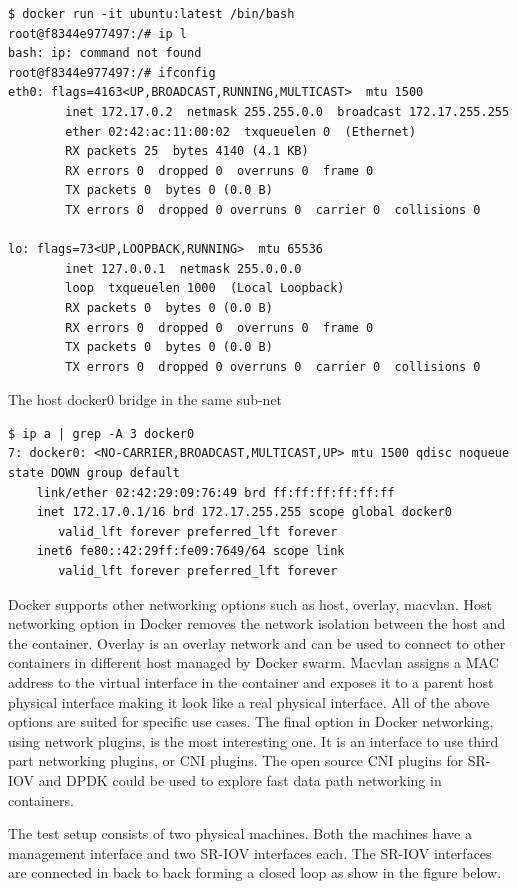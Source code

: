 \documentclass[english, 12pt, a4paper, elec, utf8, a-1b, online]{aaltothesis}
\begin{document}
\begin{lstlisting}[basicstyle={\small\ttfamily}]
$ docker run -it ubuntu:latest /bin/bash
root@f8344e977497:/# ip l
bash: ip: command not found
root@f8344e977497:/# ifconfig 
eth0: flags=4163<UP,BROADCAST,RUNNING,MULTICAST>  mtu 1500
        inet 172.17.0.2  netmask 255.255.0.0  broadcast 172.17.255.255
        ether 02:42:ac:11:00:02  txqueuelen 0  (Ethernet)
        RX packets 25  bytes 4140 (4.1 KB)
        RX errors 0  dropped 0  overruns 0  frame 0
        TX packets 0  bytes 0 (0.0 B)
        TX errors 0  dropped 0 overruns 0  carrier 0  collisions 0

lo: flags=73<UP,LOOPBACK,RUNNING>  mtu 65536
        inet 127.0.0.1  netmask 255.0.0.0
        loop  txqueuelen 1000  (Local Loopback)
        RX packets 0  bytes 0 (0.0 B)
        RX errors 0  dropped 0  overruns 0  frame 0
        TX packets 0  bytes 0 (0.0 B)
        TX errors 0  dropped 0 overruns 0  carrier 0  collisions 0
\end{lstlisting}
The host docker0 bridge in the same sub-net
\begin{lstlisting}[basicstyle={\small\ttfamily}]
$ ip a | grep -A 3 docker0
7: docker0: <NO-CARRIER,BROADCAST,MULTICAST,UP> mtu 1500 qdisc noqueue state DOWN group default 
    link/ether 02:42:29:09:76:49 brd ff:ff:ff:ff:ff:ff
    inet 172.17.0.1/16 brd 172.17.255.255 scope global docker0
       valid_lft forever preferred_lft forever
    inet6 fe80::42:29ff:fe09:7649/64 scope link 
       valid_lft forever preferred_lft forever
\end{lstlisting}

Docker supports other networking options such as host, overlay, macvlan. Host networking option in Docker removes the network isolation between the host and the container. Overlay is an overlay network and can be used to connect to other containers in different host managed by Docker swarm. Macvlan assigns a MAC address to the virtual interface in the container and exposes it to a parent host physical interface making it look like a real physical interface. All of the above options are suited for specific use cases. The final option in Docker networking, using network plugins, is the most interesting one. It is an interface to use third part networking plugins, or CNI plugins. The open source CNI plugins for SR-IOV and DPDK could be used to explore fast data path networking in containers.

The test setup consists of two physical machines. Both the machines have a management interface and two SR-IOV interfaces each. The SR-IOV interfaces are connected in back to back forming a closed loop as show in the figure below.
\end{document}
